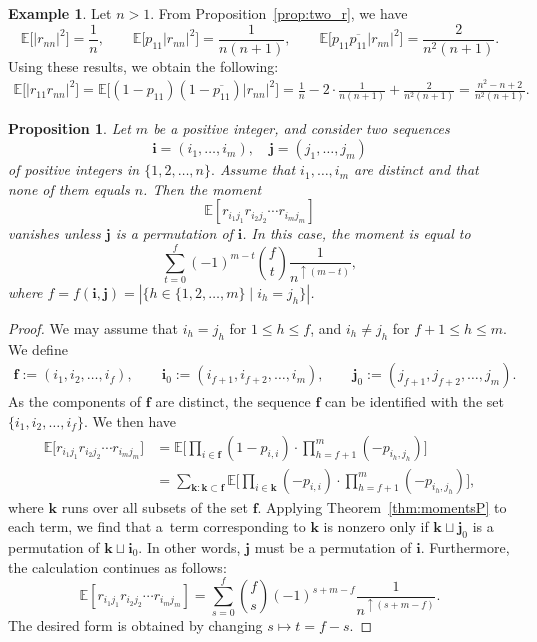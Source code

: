 \documentclass[10pt,a4paper]{amsart}
\numberwithin{equation}{section}
\newtheorem{Proposition}[Theorem]{Proposition}
\theoremstyle{definition}
\newtheorem{Example}[Theorem]{Example}
\begin{document}
\begin{Example} \label{example:two_r}
 Let $n>1$. From Proposition~\ref{prop:two_r}, we have
 \[
 \mathbb{E}\bigl[|r_{nn}|^2\bigr] = \frac{1}{n}, \qquad
 \mathbb{E}\bigl[p_{11} |r_{nn}|^2\bigr] =\frac{1}{n(n+1)}, \qquad
 \mathbb{E}\bigl[p_{11} \overline{p_{11}}|r_{nn}|^2\bigr] = \frac{2}{n^2(n+1)}.
 \]
 Using these results, we obtain the following:
 \begin{align*}
 \mathbb{E}\bigl[|r_{11} r_{nn}|^2\bigr] = \mathbb{E}\bigl[(1-p_{11})(1-\overline{p_{11}}) |r_{nn}|^2\bigr]
 = \frac{1}{n} -2 \cdot \frac{1}{n(n+1)}+ \frac{2}{n^2(n+1)} = \frac{n^2-n+2}{n^2(n+1)}.
 \end{align*}
\end{Example}


\begin{Proposition}
Let $m$ be a positive integer, and consider two sequences
\[
\bm{i}=(i_1,\dots, i_m), \quad \bm{j} =(j_1,\dots, j_m)%
\]
 of positive integers in $\{1,2,\dots,n\}.$
Assume that $i_1,\dots,i_m$ are distinct
and that none of them equals $n$.
Then the moment
\[
\mathbb{E} \left[ r_{i_1 j_1} r_{i_2 j_2} \cdots r_{i_m j_m} \right]
\]
vanishes unless $\bm{j}$ is a permutation of $\bm{i}$.
In this case, the moment is equal to
\begin{equation} \label{eq:ascention_proto}
\sum_{t=0}^f (-1)^{m-t} \binom{f}{t} \frac{1}{n^{\uparrow (m-t)}},
\end{equation}
where $f=f(\bm{i},\bm{j})=|\{h \in \{1,2,\dots,m\} \mid i_h=j_h \}|$.
\end{Proposition}

\begin{proof}
We may assume that $i_h =j_h$ for $1 \le h \le f$, and $i_h \not=j_h$ for $f+1 \le h \le m$.
We define
\begin{gather*}
\bm{f}:= (i_1,i_2, \dots, i_f), \qquad
\bm{i}_0:= (i_{f+1}, i_{f+2}, \dots, i_{m}), \qquad
\bm{j}_0:= (j_{f+1}, j_{f+2}, \dots, j_{m}).
\end{gather*}
As the components of $\bm{f}$ are distinct,
the sequence $\bm{f}$ can be identified with the set $\{i_1,i_2,\dots,i_f\}$.
We then have
\begin{align*}
 \mathbb{E} \Biggl[ r_{i_1 j_1} r_{i_2 j_2} \cdots r_{i_m j_m} \Biggr]
 &= \mathbb{E} \Biggl[\prod_{i \in \bm{f}} (1- p_{i, i}) \cdot \prod_{h=f+1}^m (-p_{i_h, j_h}) \Biggr] \\
 &= \sum_{\bm{k}: \bm{k} \subset \bm{f}} \mathbb{E} \Biggl[\prod_{i \in \bm{k}} (-p_{i,i}) \cdot\prod_{h=f+1}^m (-p_{i_h,j_h}) \Biggr],
\end{align*}
where $\bm{k}$ runs over all subsets of the set $\bm{f}$.
Applying Theorem~\ref{thm:momentsP} to each term,
we find that a~term corresponding to $\bm{k}$ is nonzero only if $\bm{k} \sqcup \bm{j}_0$ is a permutation of $\bm{k} \sqcup \bm{i}_0$. In other words, $\bm{j}$ must be a permutation of $\bm{i}$.
Furthermore, the calculation continues as follows:
\[
 \mathbb{E} \left[ r_{i_1 j_1} r_{i_2 j_2} \cdots r_{i_m j_m} \right]
 = \sum_{s=0}^f \binom{f}{s} (-1)^{s+m-f}
 \frac{1}{n^{\uparrow (s+m-f)}}.
\]
The desired form is obtained by changing $s \mapsto t =f-s$.
\end{proof}
\end{document}
